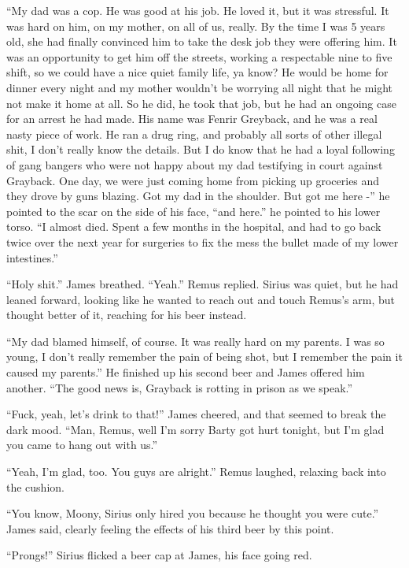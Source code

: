 \documentclass[12pt,twoside,openright]{memoir}
\begin{document}
``My dad was a cop. He was good at his job. He loved it, but it was stressful. It was hard on him, on my mother, on all of us, really. By the time I was 5 years old, she had finally convinced him to take the desk job they were offering him. It was an opportunity to get him off the streets, working a respectable nine to five shift, so we could have a nice quiet family life, ya know? He would be home for dinner every night and my mother wouldn't be worrying all night that he might not make it home at all. So he did, he took that job, but he had an ongoing case for an arrest he had made. His name was Fenrir Greyback, and he was a real nasty piece of work. He ran a drug ring, and probably all sorts of other illegal shit, I don't really know the details. But I do know that he had a loyal following of gang bangers who were not happy about my dad testifying in court against Grayback. One day, we were just coming home from picking up groceries and they drove by guns blazing. Got my dad in the shoulder. But got me here -'' he pointed to the scar on the side of his face, ``and here.'' he pointed to his lower torso. ``I almost died. Spent a few months in the hospital, and had to go back twice over the next year for surgeries to fix the mess the bullet made of my lower intestines.''

``Holy shit.'' James breathed. ``Yeah.'' Remus replied. Sirius was quiet, but he had leaned forward, looking like he wanted to reach out and touch Remus's arm, but thought better of it, reaching for his beer instead.

``My dad blamed himself, of course. It was really hard on my parents. I was so young, I don't really remember the pain of being shot, but I remember the pain it caused my parents.'' He finished up his second beer and James offered him another. ``The good news is, Grayback is rotting in prison as we speak.''

``Fuck, yeah, let's drink to that!'' James cheered, and that seemed to break the dark mood. ``Man, Remus, well I'm sorry Barty got hurt tonight, but I'm glad you came to hang out with us.''

``Yeah, I'm glad, too. You guys are alright.'' Remus laughed, relaxing back into the cushion.

``You know, Moony, Sirius only hired you because he thought you were cute.'' James said, clearly feeling the effects of his third beer by this point.

``Prongs!'' Sirius flicked a beer cap at James, his face going red.
\end{document}

